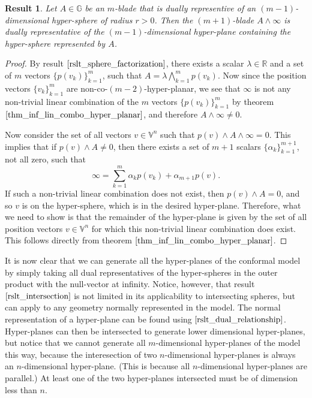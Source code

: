 \documentclass{article}
\newcommand{\R}{\mathbb{R}}
\newcommand{\V}{\mathbb{V}}
\newcommand{\G}{\mathbb{G}}
\newcommand{\nvai}{\infty}
\newtheorem{result}{Result}[section]
\begin{document}
\pagebreak
\begin{result}\label{rslt_sphere_to_plane}
Let $A\in\G$ be an $m$-blade that is dually representive of an
$(m-1)$-dimensional hyper-sphere of radius $r>0$.
Then the $(m+1)$-blade $A\wedge\nvai$ is dually representative
of the $(m-1)$-dimensional hyper-plane containing the
hyper-sphere represented by $A$.
\end{result}
\begin{proof}
By result $\eqref{rslt_sphere_factorization}$, there exists a
scalar $\lambda\in\R$ and a set of $m$ vectors $\{p(v_k)\}_{k=1}^m$,
such that $A = \lambda\bigwedge_{k=1}^m p(v_k)$.
Now since the position vectors $\{v_k\}_{k=1}^m$ are non-co-$(m-2)$-hyper-planar,
we see that $\nvai$ is not any non-trivial linear combination of the
$m$ vectors $\{p(v_k)\}_{k=1}^m$ by theorem $\eqref{thm_inf_lin_combo_hyper_planar}$,
and therefore $A\wedge\nvai\neq 0$.

Now consider the set of all
vectors $v\in\V^n$ such that $p(v)\wedge A\wedge\nvai=0$.
This implies that if $p(v)\wedge A\neq 0$, then there
exists a set of $m+1$ scalars $\{\alpha_k\}_{k=1}^{m+1}$, not all zero,
such that
\begin{equation*}
\nvai = \sum_{k=1}^m \alpha_k p(v_k) + \alpha_{m+1}p(v).
\end{equation*}
If such a non-trivial linear combination does not exist, then $p(v)\wedge A=0$,
and so $v$ is on the hyper-sphere, which is in the desired hyper-plane.
Therefore, what we need to show is that the remainder of the hyper-plane
is given by the set of all position vectors $v\in\V^n$ for which this non-trivial linear
combination does exist.  This follows directly from theorem $\eqref{thm_inf_lin_combo_hyper_planar}$.
\end{proof}

It is now clear that we can generate all the hyper-planes of the conformal
model by simply taking all dual representatives of the hyper-spheres
in the outer product with the null-vector at infinity.
Notice, however, that result $\eqref{rslt_intersection}$ is not limited in its applicability
to intersecting spheres, but can apply to any geometry normally represented in the model.
The normal representation of a hyper-plane can be found using $\eqref{rslt_dual_relationship}$.
Hyper-planes can then be intersected to generate lower dimensional hyper-planes, but notice
that we cannot generate all $m$-dimensional hyper-planes of the model this way, because
the interesection of two $n$-dimensional hyper-planes is always an $n$-dimensional hyper-plane.
(This is because all $n$-dimensional hyper-planes are parallel.)
At least one of the two hyper-planes intersected must be of dimension less than $n$.
\end{document}
